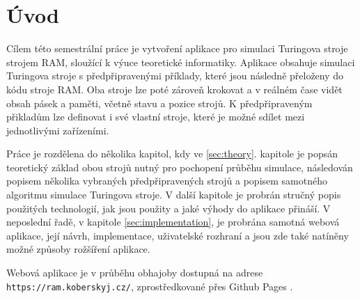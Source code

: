 \chapter{Úvod}
\label{sec:Introduction}
Cílem této semestrální práce je vytvoření aplikace pro simulaci Turingova stroje strojem RAM, sloužící k výuce teoretické informatiky. 
Aplikace obsahuje simulaci Turingova stroje s předpřipravenými příklady, které jsou následně přeloženy do kódu stroje RAM. 
Oba stroje lze poté zároveň krokovat a v reálném čase vidět obsah pásek a paměti, včetně stavu a pozice strojů. 
K předpřipraveným přikladům lze definovat i své vlastní stroje, které je možné sdílet mezi jednotlivými zařízeními.

Práce je rozdělena do několika kapitol, kdy ve \ref{sec:theory}. kapitole je popsán teoretický základ obou strojů nutný pro pochopení průběhu simulace, 
následován popisem několika vybraných předpřipravených strojů a popisem samotného algoritmu simulace Turingova stroje. 
V další kapitole je probrán stručný popis použitých technologií, jak jsou použity a jaké výhody do aplikace přináší.
V neposlední řadě, v kapitole \ref{sec:implementation}, je probrána samotná webová aplikace, její návrh, implementace, uživatelské rozhraní a jsou zde také natíněny možné způsoby rožšíření aplikace.

Webová aplikace je v průběhu obhajoby dostupná na adrese \texttt{https://ram.koberskyj.cz/}, zprostředkované přes Github Pages \cite{githubpages}.
\endinput